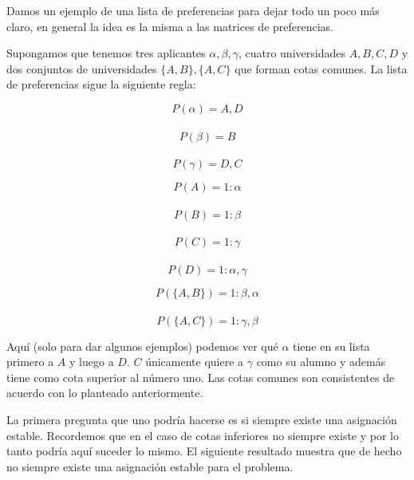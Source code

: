 Damos un ejemplo de una lista de preferencias para dejar todo un poco más claro, en general la idea es la misma a las matrices de preferencias.


\begin{eje} \cite{Todo}
\label{listprefeje}
Supongamos que tenemos tres aplicantes $\alpha,\beta, \gamma$, cuatro universidades $A,B,C,D$ y dos conjuntos de universidades $\{A,B\},\{A,C\}$ que forman cotas comunes. La lista de preferencias sigue la siguiente regla:

\noindent \begin{minipage}{.3\linewidth}
$$P(\alpha)=A,D$$ \\
$$P(\beta)=B$$ \\
$$P(\gamma)=D,C$$ 
\end{minipage}%
\begin{minipage}{.3\linewidth}
$$P(A)=1:\alpha$$ \\
$$P(B)=1:\beta$$ \\
$$P(C)=1: \gamma$$ \\
$$P(D)=1: \alpha, \gamma$$ 
\end{minipage}
\begin{minipage}{.4\linewidth}
$$P(\{A,B\})= 1:\beta,\alpha$$ \\
$$P(\{A,C\})=1:\gamma,\beta$$
\end{minipage}
Aquí (solo para dar algunos ejemplos) podemos ver qué $\alpha$ tiene en su lista primero a $A$ y luego a $D$. $C$ únicamente quiere a $\gamma$ como su alumno y además tiene como cota superior al número uno. Las cotas comunes son consistentes de acuerdo con lo planteado anteriormente. 

\end{eje}

La primera pregunta que uno podría hacerse es si siempre existe una asignación estable. Recordemos que en el caso de cotas inferiores no siempre existe y por lo tanto podría aquí suceder lo mismo. El siguiente resultado muestra que de hecho no siempre existe una asignación estable para el problema.

